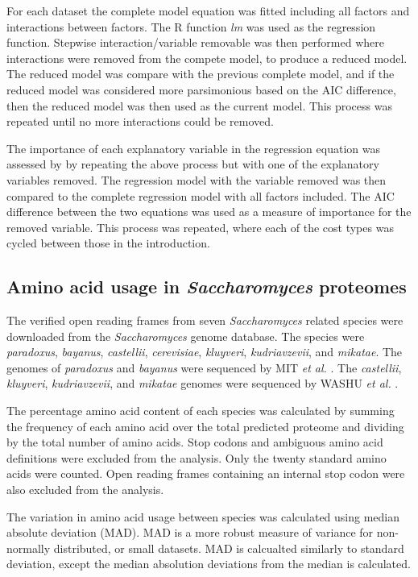 For each dataset the complete model equation was fitted including all factors and interactions between factors. The R function \emph{lm} was used as the regression function. Stepwise interaction/variable removable was then performed where interactions were removed from the compete model, to produce a reduced model. The reduced model was compare with the previous complete model, and if the reduced model was considered more parsimonious based on the AIC difference, then the reduced model was then used as the current model. This process was repeated until no more interactions could be removed.

The importance of each explanatory variable in the regression equation was assessed by by repeating the above process but with one of the explanatory variables removed. The regression model with the variable removed was then compared to the complete regression model with all factors included. The AIC difference between the two equations was used as a measure of importance for the removed variable. This process was repeated, where each of the cost types was cycled between those in the introduction.

\subsection{Amino acid usage in \emph{Saccharomyces} proteomes}

The verified open reading frames from seven \emph{Saccharomyces} related species were downloaded from the \emph{Saccharomyces} genome database. The species were \emph{paradoxus}, \emph{bayanus}, \emph{castellii}, \emph{cerevisiae}, \emph{kluyveri}, \emph{kudriavzevii}, and \emph{mikatae}. The genomes of \emph{paradoxus} and \emph{bayanus} were sequenced by MIT \emph{et al.} \cite{mit_paper}. The \emph{castellii}, \emph{kluyveri}, \emph{kudriavzevii}, and \emph{mikatae} genomes were sequenced by WASHU \emph{et al.} \cite{washu}.

The percentage amino acid content of each species was calculated by summing the frequency of each amino acid over the total predicted proteome and dividing by the total number of amino acids. Stop codons and ambiguous amino acid definitions were excluded from the analysis. Only the twenty standard amino acids were counted. Open reading frames containing an internal stop codon were also excluded from the analysis.

The variation in amino acid usage between species was calculated using median absolute deviation (MAD). MAD is a more robust measure of variance for non-normally distributed, or small datasets. MAD is calcualted similarly to standard deviation, except the median absolution deviations from the median is calculated.

